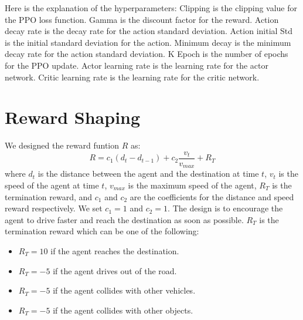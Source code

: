 Here is the explanation of the hyperparameters: Clipping is the clipping value for the PPO loss function.
Gamma is the discount factor for the reward.
Action decay rate is the decay rate for the action standard deviation.
Action initial Std is the initial standard deviation for the action.
Minimum decay is the minimum decay rate for the action standard deviation.
K Epoch is the number of epochs for the PPO update.
Actor learning rate is the learning rate for the actor network.
Critic learning rate is the learning rate for the critic network.
\section{Reward Shaping}\label{sec:reward-shaping}
We designed the reward funtion $R$ as:
\begin{equation}
    R = c_{1}(d_{t} - d_{t-1}) + c_{2}\frac{v_{t}}{v_{max}} + R_{T}
\end{equation}
where $d_{t}$ is the distance between the agent and the destination at time $t$, $v_{t}$ is the speed of the agent at time $t$, $v_{max}$ is the maximum speed of the agent, $R_{T}$ is the termination reward, and $c_{1}$ and $c_{2}$ are the coefficients for the distance and speed reward respectively.
We set $c_{1} = 1$ and $c_{2} = 1$.
The design is to encourage the agent to drive faster and reach the destination as soon as possible.
$R_{T}$ is the termination reward which can be one of the following:
\begin{itemize}
    \item $R_{T} = 10$ if the agent reaches the destination.
    \item $R_{T} = -5$ if the agent drives out of the road.
    \item $R_{T} = -5$ if the agent collides with other vehicles.
    \item $R_{T} = -5$ if the agent collides with other objects.
\end{itemize}


